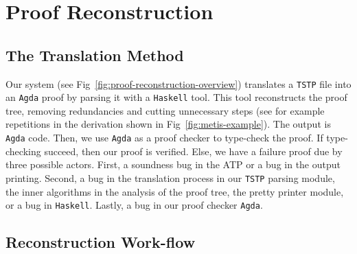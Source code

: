 \documentclass[../main.tex]{subfiles}
\begin{document}

\section{Proof Reconstruction}
\label{sec:proof-reconstruction}

\subsection{The Translation Method}

Our system (see Fig~\ref{fig:proof-reconstruction-overview}) translates a \verb!TSTP!
file into an \verb!Agda! proof by parsing it with a \verb!Haskell! tool.
This tool reconstructs the proof tree, removing redundancies and
cutting unnecessary steps (see for example repetitions in the derivation shown in
Fig~\ref{fig:metis-example}). The output is \verb!Agda! code.
Then, we use \verb!Agda! as a proof checker to type-check the proof.
If type-checking succeed, then our proof is verified. Else, we have a failure
proof due by three possible actors. First, a soundness bug in the ATP or a bug
in the output printing. Second, a bug in the translation process in our \verb!TSTP! parsing
module, the inner algorithms in the analysis of the proof tree, the pretty printer
module, or a bug in \verb!Haskell!. Lastly, a bug in our proof checker \verb!Agda!.


\subsection{Reconstruction Work-flow}
\end{document}
